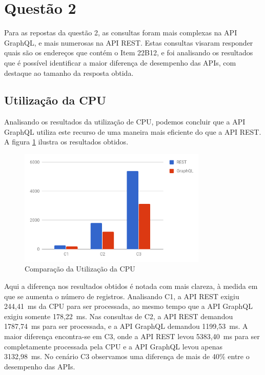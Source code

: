 
\section{Questão 2}

Para as repostas da questão 2, as consultas foram mais complexas na API GraphQL, e mais numerosas na API REST. Estas consultas visaram responder quais são os endereços que contém o Item 22B12, e foi analisando os resultados que é possível identificar a maior diferença de desempenho das APIs, com destaque ao tamanho da resposta obtida.

\subsection{Utilização da CPU}

Analisando os resultados da utilização de CPU, podemos concluir que a API GraphQL utiliza este recurso de uma maneira mais eficiente do que a API REST. A figura \ref{fig:q2-cpu} ilustra os resultados obtidos.

\begin{figure}[htbp]
    \centering
    \includegraphics[width=0.8\textwidth]{figuras/q2-cpu.png}
    \caption{Comparação da Utilização da CPU}
    \label{fig:q2-cpu}
    \author{fonte: Autor}
\end{figure}

Aqui a diferença nos resultados obtidos é notada com mais clareza, à medida em que se aumenta o número de registros. Analisando C1, a API REST exigiu 244,41~ms da CPU para ser processada, ao mesmo tempo que a API GraphQL exigiu somente 178,22~ms. Nas consultas de C2, a API REST demandou 1787,74~ms para ser processada, e a API GraphQL demandou 1199,53~ms. A maior diferença encontra-se em C3, onde a API REST levou 5383,40~ms para ser completamente processada pela CPU e a API GraphQL levou apenas 3132,98~ms. No cenário C3 observamos uma diferença de mais de 40\% entre o desempenho das APIs.

